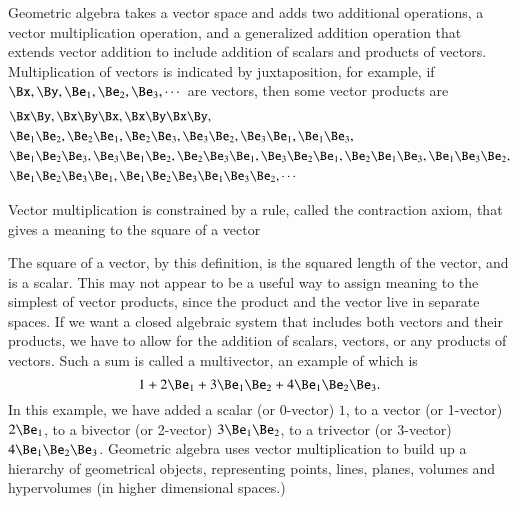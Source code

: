 %
%
Geometric algebra takes a vector space and adds two additional operations, a vector multiplication operation, and a generalized addition operation that extends vector addition to include addition of scalars and products of vectors.
Multiplication of vectors is indicated by juxtaposition, for example, if \( \Bx, \By, \Be_1, \Be_2, \Be_3, \cdots \) are vectors, then some vector products are
\begin{dmath}\label{eqn:multivector:20}
\begin{aligned}
&\Bx \By, \Bx \By \Bx, \Bx \By \Bx \By, \\
&\Be_1 \Be_2, \Be_2 \Be_1, \Be_2 \Be_3, \Be_3 \Be_2, \Be_3 \Be_1, \Be_1 \Be_3, \\
&\Be_1 \Be_2 \Be_3, \Be_3 \Be_1 \Be_2, \Be_2 \Be_3 \Be_1, \Be_3 \Be_2 \Be_1, \Be_2 \Be_1 \Be_3, \Be_1 \Be_3 \Be_2, \\
&\Be_1 \Be_2 \Be_3 \Be_1, \Be_1 \Be_2 \Be_3 \Be_1 \Be_3 \Be_2, \cdots
\end{aligned}
\end{dmath}

Vector multiplication is constrained by a rule, called the contraction axiom, that gives a meaning to the square of a vector

The square of a vector, by this definition, is the squared length of the vector, and is a scalar.
This may not appear to be a useful way to assign meaning to the simplest of vector products, since the product and the vector live in separate spaces.
If we want a closed algebraic system that includes both vectors and their products, we have to allow for the addition of scalars, vectors, or any products of vectors.  Such a sum is called a multivector, an example of which is
\begin{dmath}\label{eqn:multivector:40}
1 + 2 \Be_1 + 3 \Be_1 \Be_2 + 4 \Be_1 \Be_2 \Be_3.
\end{dmath}
In this example, we have added a
scalar (or 0-vector) \( 1 \), to a
vector (or 1-vector) \( 2 \Be_1 \), to a
bivector (or 2-vector) \( 3 \Be_1 \Be_2 \), to a
trivector (or 3-vector) \( 4 \Be_1 \Be_2 \Be_3 \).
Geometric algebra uses vector multiplication to build up a hierarchy of geometrical objects, representing points, lines, planes, volumes and hypervolumes (in higher dimensional spaces.)

